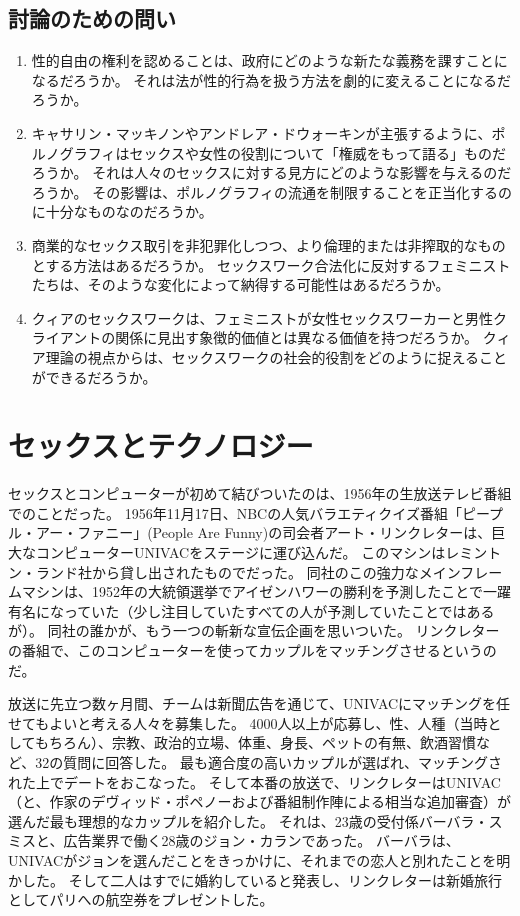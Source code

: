 \documentclass[paper=a4,book,openany]{jlreq}
\newcommand{\ig}[1]{}           %
\begin{document}
\section{討論のための問い}

\begin{enumerate}
    \item 性的自由の権利を認めることは、政府にどのような新たな義務を課すことになるだろうか。
それは法が性的行為を扱う方法を劇的に変えることになるだろうか。
    \item キャサリン・マッキノンやアンドレア・ドウォーキン\ig{Andrea Dworkin}が主張するように、ポルノグラフィはセックスや女性の役割について「権威をもって語る」ものだろうか。
それは人々のセックスに対する見方にどのような影響を与えるのだろうか。
その影響は、ポルノグラフィの流通を制限することを正当化するのに十分なものなのだろうか。
    \item 商業的なセックス取引を非犯罪化しつつ、より倫理的または非搾取的なものとする方法はあるだろうか。
セックスワーク合法化に反対するフェミニストたちは、そのような変化によって納得する可能性はあるだろうか。
    \item クィアのセックスワークは、フェミニストが女性セックスワーカーと男性クライアントの関係に見出す象徴的価値とは異なる価値を持つだろうか。
クィア理論の視点からは、セックスワークの社会的役割をどのように捉えることができるだろうか。
    \end{enumerate}

\chapter{セックスとテクノロジー}

セックスとコンピューターが初めて結びついたのは、1956年の生放送テレビ番組でのことだった。
1956年11月17日、NBCの人気バラエティクイズ番組「ピープル・アー・ファニー」(People Are Funny)の司会者アート・リンクレターは、巨大なコンピューターUNIVACをステージに運び込んだ。
このマシンはレミントン・ランド社から貸し出されたものでだった。
同社のこの強力なメインフレームマシンは、1952年の大統領選挙でアイゼンハワーの勝利を予測したことで一躍有名になっていた（少し注目していたすべての人が予測していたことではあるが）。
同社の誰かが、もう一つの斬新な宣伝企画を思いついた。
リンクレターの番組で、このコンピューターを使ってカップルをマッチングさせるというのだ。

放送に先立つ数ヶ月間、チームは新聞広告を通じて、UNIVACにマッチングを任せてもよいと考える人々を募集した。
4000人以上が応募し、性、人種（当時としてもちろん）、宗教、政治的立場、体重、身長、ペットの有無、飲酒習慣など、32の質問に回答した。
最も適合度の高いカップルが選ばれ、マッチングされた上でデートをおこなった。
そして本番の放送で、リンクレターはUNIVAC（と、作家のデヴィッド・ポペノーおよび番組制作陣による相当な追加審査）が選んだ最も理想的なカップルを紹介した。
それは、23歳の受付係バーバラ・スミスと、広告業界で働く28歳のジョン・カランであった。
バーバラは、UNIVACがジョンを選んだことをきっかけに、それまでの恋人と別れたことを明かした。
そして二人はすでに婚約していると発表し、リンクレターは新婚旅行としてパリへの航空券をプレゼントした。
\end{document}
